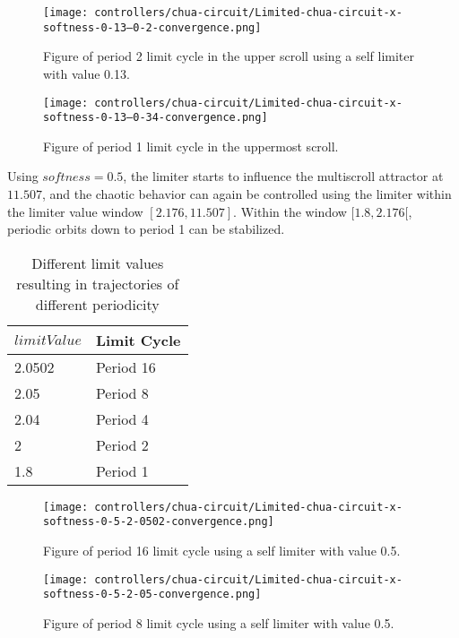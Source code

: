 \documentclass[main]{subfiles}
\begin{document}
\begin{figure}[H]
\centering
\texttt{[image: controllers/chua-circuit/Limited-chua-circuit-x-softness-0-13--0-2-convergence.png]}
\caption[Figure of period 3 limit cycle]{Figure of period 2 limit cycle in the upper scroll using a self limiter with value 0.13.}
\label{figure:x-0.13-2-limit-cycle-upperscroll-trajectory}
\end{figure}

\begin{figure}[H]
\centering
\texttt{[image: controllers/chua-circuit/Limited-chua-circuit-x-softness-0-13--0-34-convergence.png]}
\caption[Figure of period 1 limit cycle]{Figure of period 1 limit cycle in the uppermost scroll.}
\label{figure:x-0.13-1-limit-cycle-upperscroll-trajectory}
\end{figure}

Using \(softness=0.5\), the limiter starts to influence the multiscroll attractor at \(11.507\), and the chaotic behavior can again be controlled using the limiter within the limiter value window \([2.176,11.507]\). %
%
Within the window \([1.8,2.176[\), periodic orbits down to period 1 can be stabilized.

\begin{table}[H]
\renewcommand{\arraystretch}{1.2}
\center
\begin{tabular}{@{}ll@{}}
	\toprule
   \(limitValue\) & Limit Cycle\\
   \midrule
   2.0502 & Period 16 \\
   2.05 & Period 8 \\ 
   2.04 & Period 4 \\
   2  & Period 2 \\
   1.8 & Period 1 \\
   \bottomrule
\end{tabular}
\caption{Different limit values resulting in trajectories of different periodicity}
\label{table:x-0.5-lowermost-periodicities}
\end{table}

\begin{figure}[H]
\centering
\texttt{[image: controllers/chua-circuit/Limited-chua-circuit-x-softness-0-5-2-0502-convergence.png]}
\caption[Figure of period 16 limit cycle]{Figure of period 16 limit cycle using a self limiter with value 0.5.}
\label{figure:x-0.5-16-limit-cycle-trajectory}
\end{figure}

\begin{figure}[H]
\centering
\texttt{[image: controllers/chua-circuit/Limited-chua-circuit-x-softness-0-5-2-05-convergence.png]}
\caption[Figure of period 8 limit cycle]{Figure of period 8 limit cycle using a self limiter with value 0.5.}
\label{figure:x-0.5-8-limit-cycle-trajectory}
\end{figure}
\end{document}
